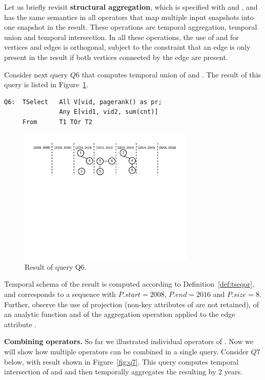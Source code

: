 Let us briefly revisit {\bf structural aggregation}, which is
specified with  and , and has the same semantics
in all \ql operators that map multiple input snapshots into one
snapshot in the result. These operations are temporal aggregation,
temporal union and temporal intersection.  In all these operations,
the use of  and  for vertices and edges is
orthogonal, subject to the constraint that an edge is only present
in the result if both vertices connected by the edge are present.

Consider next query $Q6$ that computes temporal union of 
and .  The result of this query is listed in
Figure~\ref{fig:q6}.

\begin{verbatim}
Q6:  TSelect   All V[vid, pagerank() as pr; 
               Any E[vid1, vid2, sum(cnt)]
     From      T1 TOr T2
\end{verbatim}

\begin{figure}
\centering
\includegraphics[width=3.3in]{figs/q6.pdf}
\caption{Result of query Q6.}
\label{fig:q6}
\end{figure}

Temporal schema of the result is computed according to
Definition~\ref{def:tseqor}, and corresponds to a sequence with
$P.start = 2008$, $P.end=2016$ and $P.size=8$.  Further, observe the
use of projection (non-key attributes of  are not retained),
of an analytic function  and of the aggregation
operation  applied to the edge attribute .

{\bf Combining operators.}  So far we illustrated individual operators
of \ql.  Now we will show how multiple operators can be combined in a
single query.  Consider $Q7$ below, with result shown in
Figure~\ref{fig:q7}. This query computes temporal intersection of
 and  and then temporally aggregates the resulting
\tg by 2 years.

